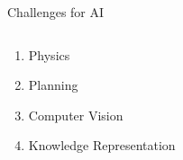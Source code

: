 \documentclass[smaller,dvipsnames]{beamer}
\begin{document}
\begin{frame}{Challenges for AI}
	 \begin{columns}
		 \begin{column}{0.35\textwidth}
			\begin{enumerate}
				\item<1-> \alert<1>{Physics}
				\item<2-> \alert<2-3>{Planning}
				\item<4-> \alert<4>{Computer Vision}
				\item<5-> \alert<5>{Knowledge Representation}
			\end{enumerate}
		 \end{column}
		 \begin{column}{0.65\textwidth}
			\begin{center}
			\end{center}
		 \end{column}
	 \end{columns}
\end{frame}
\end{document}
